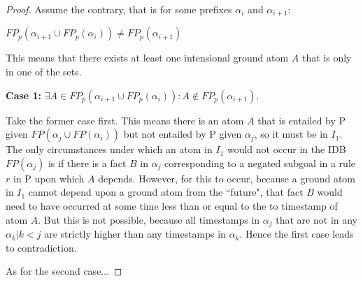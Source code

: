 \begin{proof}



Assume the contrary, that is for some prefixes $\alpha_i$ and $\alpha_{i+1}$:

$FP_p(\alpha_{i+1} \cup FP_p(\alpha_i)) \neq FP_p(\alpha_{i+1})$

This means that there exists at least one intensional ground atom $A$ that is
only in one of the sets.

{\bf Case 1:} $\exists A \in FP_p(\alpha_{i+1} \cup FP_p(\alpha_i)) : A \not\in FP_p(\alpha_{i+1}).$



Take the former case first.  This means there is an atom $A$ that is entailed by P given $FP(\alpha_{j} \cup FP(\alpha_{i}))$
but not entailed by P given $\alpha_{j}$, so it must be in $I_1$.   The only circumstances under which an atom in
$I_1$ would not occur in the IDB $FP(\alpha_{j})$ is if there is a fact $B$ in $\alpha_{j}$ 
corresponding to a negated subgoal in a rule $r$ in P upon which $A$ depends.  However, for this to occur, because a ground atom 
in $I_1$ cannot depend upon a ground atom from the ``future", that fact $B$ would need to have occurred at some time less than 
or equal to the to timestamp of atom $A$.  But this is not possible, because all timestamps in $\alpha_{j}$ that are not in any $\alpha_{k} | k<j$
are strictly higher than any timestamps in $\alpha_{k}$.  Hence the first case leads to contradiction.

As for the second case...

\end{proof}

